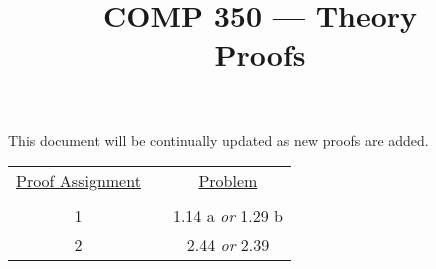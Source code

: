 \documentclass[nobib]{tufte-handout}
\title{COMP 350 --- Theory \\ Proofs}
\begin{document}
\maketitle

This document will be continually updated as new proofs are added.

\begin{center}
\begin{tabular}{ccc}
  \underline{Proof Assignment} & \hspace{.5in} &  \underline{Problem} \\ \\
  1 & & 1.14 a \textit{or} 1.29 b \\
  2 & & 2.44 \textit{or} 2.39 \\
\end{tabular}
\end{center}
\end{document}
